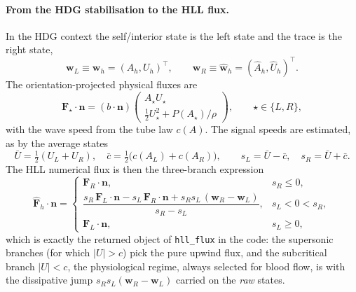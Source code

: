 \documentclass[11pt]{article}
\begin{document}
\paragraph{From the HDG stabilisation to the HLL flux.}
In the HDG context the self/interior state is the
left state and the trace is the right state,
\begin{equation}
  \mathbf w_L \equiv \mathbf w_h = (A_h,U_h)^\top,
  \qquad
  \mathbf w_R \equiv \widehat{\mathbf w}_h = (\widehat A_h,\widehat U_h)^\top .
\end{equation}
The orientation-projected physical fluxes are
\begin{equation}
  \mathbf F_\star\cdot\bm n
  =
  (b\!\cdot\!\bm n)
  \begin{pmatrix}
  A_\star U_\star \\[2pt]
  \tfrac12 U_\star^2 + P(A_\star)/\rho
  \end{pmatrix},
  \qquad \star\in\{L,R\},
  \label{eq:proj_flux}
\end{equation}
with the wave speed from the tube law $c(A)$.
The signal speeds are estimated, as by the average states
\begin{equation}
  \bar U=\tfrac12(U_L+U_R),
  \quad
  \bar c=\tfrac12\bigl(c(A_L)+c(A_R)\bigr),
  \qquad
  s_L=\bar U-\bar c,
  \quad
  s_R=\bar U+\bar c .
  \label{eq:wave_speeds}
\end{equation}
The HLL numerical flux is then the three-branch expression \cite[Chapter~10]{toro2013riemann}
\begin{equation}
  \widehat{\mathbf F}_h\cdot\bm n
  =
  \begin{cases}
  \mathbf F_R\cdot\bm n, & s_R\le 0,\\[6pt]
  \dfrac{s_R\,\mathbf F_L\cdot\bm n - s_L\,\mathbf F_R\cdot\bm n
         + s_R s_L\,(\mathbf w_R-\mathbf w_L)}{s_R-s_L}, 
  & s_L<0<s_R, \\[6pt]
  \mathbf F_L\cdot\bm n, & s_L\ge 0,
  \end{cases}
  \label{eq:hll_flux}
\end{equation}
which is exactly the returned object of \texttt{hll\_flux} in the code: the supersonic
branches (for which $|U| >c$) pick the pure upwind flux, and the subcritical branch
$|U|<c$, the physiological regime, always selected for blood flow, is with the dissipative jump $s_R s_L(\mathbf w_R-\mathbf w_L)$
carried on the \emph{raw} states.
\end{document}
